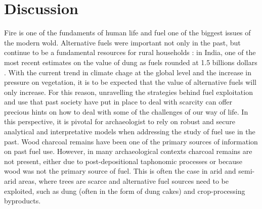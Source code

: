 \documentclass[authoryear,preprint,review,12pt]{elsarticle}
\begin{document}
\section{Discussion}
\label{sec:4}
Fire is one of the fundaments of human life and fuel one of the biggest issues of the modern wold. Alternative fuels were important not only in the past, but continue to be a fundamental resources for rural households \citep{Viswanathan2005}: in India, one of the most recent estimates on the value of dung as fuels rounded at 1.5 billions dollars \citep{Harris2000}. With the current trend in climate chage at the global level and the increase in pressure on vegetation, it is to be expected that the value of alternative fuels will only increase. For this reason, unravelling the strategies behind fuel exploitation and use that past society have put in place to deal with scarcity can offer precious hints on how to deal with some of the challenges of our way of life. In this perspective, it is pivotal for archaeologist to rely on robust and secure analytical and interpretative models when addressing the study of fuel use in the past. Wood charcoal remains have been one of the primary sources of information on past fuel use. However, in many archaeological contexts charcoal remains are not present, either due to post-depositional taphonomic processes or because wood was not the primary source of fuel. This is often the case in arid and semi-arid areas, where trees are scarce and alternative fuel sources need to be exploited, such as dung (often in the form of dung cakes) and crop-processing byproducts.\par
\end{document}

